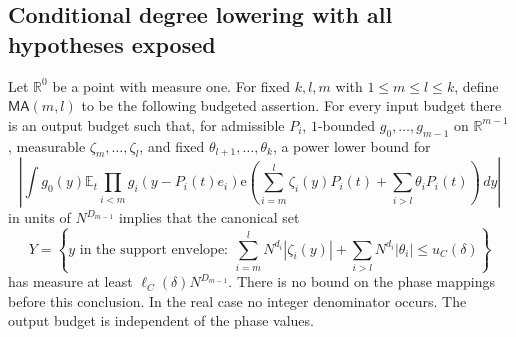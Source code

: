 \documentclass[11pt]{article}
\theoremstyle{definition}
\newcommand{\ee}[1]{\mathrm e\!\left(#1\right)}
\begin{document}
\subsection{Conditional degree lowering with all hypotheses exposed}\label{patch:conditional-dl}
Let $\mathbb R^0$ be a point with measure one.  For fixed $k,l,m$ with $1\leq m\leq l\leq k$,
define $\mathsf{MA}(m,l)$ to be the following budgeted assertion.  For every input budget
there is an output budget such that, for admissible $P_i$, $1$-bounded $g_0,\ldots,g_{m-1}$
on $\mathbb R^{m-1}$, measurable $\zeta_m,\ldots,\zeta_l$, and fixed
$\theta_{l+1},\ldots,\theta_k$, a power lower bound for
\begin{equation}\label{patch:ma-correlation}
 \left|\int g_0(y)\mathbb E_t\prod_{i<m}g_i(y-P_i(t)e_i)
       \ee{\sum_{i=m}^l\zeta_i(y)P_i(t)+\sum_{i>l}\theta_iP_i(t)}\,dy\right|
\end{equation}
in units of $N^{D_{m-1}}$ implies that the canonical set
\begin{equation}\label{patch:ma-set}
 Y=\left\{y\text{ in the support envelope}:\
      \sum_{i=m}^lN^{d_i}|\zeta_i(y)|+\sum_{i>l}N^{d_i}|\theta_i|
                           \leq u_C(\delta)\right\}
\end{equation}
has measure at least $\ell_C(\delta)N^{D_{m-1}}$.
There is no bound on the phase mappings before this conclusion.  In the real case no
integer denominator occurs.  The output budget is independent of the phase values.
\end{document}
